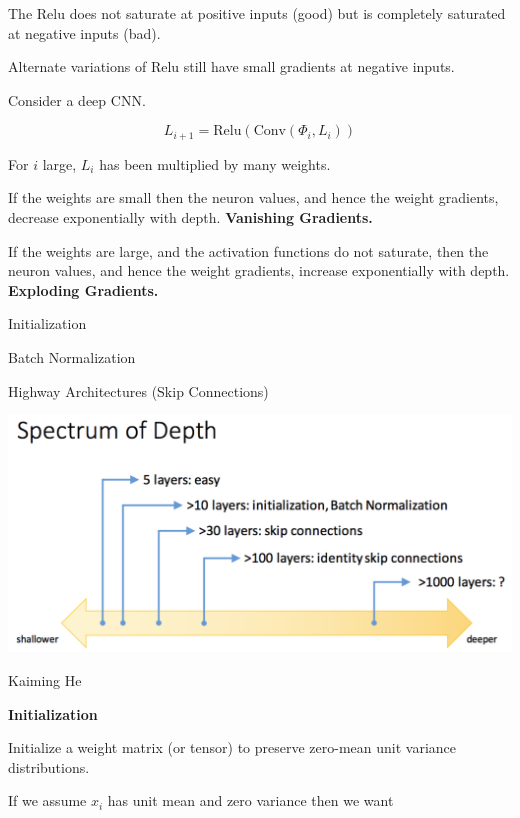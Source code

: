 {\vfill
The Relu does not saturate at positive inputs (good) but is completely saturated at negative inputs (bad).

\vfill
Alternate variations of Relu still have small gradients at negative inputs.


Consider a deep CNN.

$$L_{i+1} = \mathrm{Relu}(\mathrm{Conv}(\Phi_i,L_i))$$

\vfill
For $i$ large, $L_i$ has been multiplied by many weights.

\vfill
If the weights are small then the neuron values, and hence the weight gradients, decrease exponentially with depth. {\bf Vanishing Gradients.}

\vfill
If the weights are large, and the activation functions do not saturate, then the neuron values, and hence the weight gradients,
increase exponentially with depth. {\bf Exploding Gradients.}


\centerline{Initialization}

\vfill
\centerline{Batch Normalization}

\vfill
\centerline{Highway Architectures (Skip Connections)}


\centerline{\includegraphics[width = 9in]{../images/DepthSpectrum}}

\centerline{\large Kaiming He}

\slide{}
\centerline{\bf Initialization}
\vfill


Initialize a weight matrix (or tensor) to preserve zero-mean unit variance distributions.

\vfill
If we assume $x_i$ has unit mean and zero variance then we want

}
